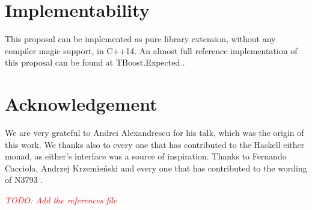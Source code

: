 \documentclass[a4paper,10pt]{article}
\newcommand{\todo}[1]{\emph{\textcolor{red}{TODO: #1}}}
\begin{document}
\section{Implementability}
This proposal can be implemented as pure library extension, without any compiler magic support, in C++14. An almost full reference implementation of this proposal can be found at TBoost.Expected \cite{boost.expected}. 
\section{Acknowledgement}

We are very grateful to Andrei Alexandrescu for his talk, which was the origin of this work.
We thanks also to every one that has contributed to the Haskell either monad, as either's interface was a source of inspiration.
Thanks to Fernando Cacciola, Andrzej Krzemieński and every one that has contributed to the wording of N3793 \cite{OptionalRev5}.

\newpage
\todo{Add the references file}


\end{document}
